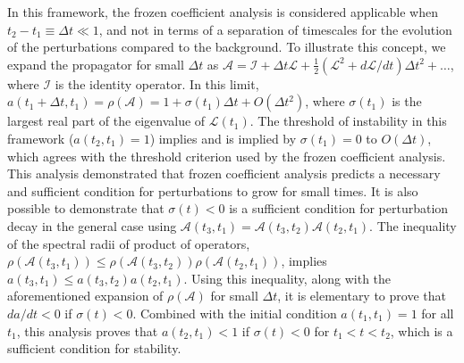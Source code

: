 \documentclass[letterpaper,10pt,prl,twocolumn,aps,reprint,superscriptaddress]{revtex4-1}
\newcommand{\cL}{\boldsymbol{\mathcal{L}}}
\newcommand{\cA}{\boldsymbol{\mathcal{A}}}
\newcommand{\cI}{\boldsymbol{\mathcal{I}}}
\begin{document}
In this framework, the frozen coefficient analysis is considered applicable when $t_2 - t_1 \equiv \Delta t \ll 1$, and not in terms of a separation of timescales for the evolution of the perturbations compared to the background.
To illustrate this concept, we expand the propagator for small $\Delta t$ as $\cA = \cI + \Delta t \cL + \frac{1}{2} \left(\cL^2 + d\cL/dt \right) \Delta t^2 + \dots$, where $\cI$ is the identity operator. 
In this limit, $a(t_1 + \Delta t, t_1) = \rho(\cA) = 1 + \sigma(t_1) \Delta t + O(\Delta t^2)$, where $\sigma(t_1)$ is the largest real part of the eigenvalue of $\cL(t_1)$.
The threshold of instability in this framework ($a(t_2,t_1) = 1$) implies and is implied by $\sigma(t_1) = 0$ to $O(\Delta t)$, which agrees with the threshold criterion used by the frozen coefficient analysis.
This analysis demonstrated that frozen coefficient analysis predicts a necessary and sufficient condition for perturbations to grow for small times. It is also possible to demonstrate that $\sigma(t) < 0$ is a sufficient condition for perturbation decay in the general case using $\cA(t_3,t_1) = \cA (t_3, t_2) \cA(t_2, t_1)$. The inequality of the spectral radii of product of operators, $\rho(\cA(t_3,t_1)) \le \rho(\cA(t_3,t_2)) \rho(\cA(t_2,t_1))$, implies $a(t_3, t_1) \le a(t_3, t_2) a(t_2, t_1)$. Using this inequality, along with the aforementioned expansion of $\rho(\cA)$ for small $\Delta t$, it is elementary to prove that $da/dt < 0$ if $\sigma(t)<0$. Combined with the initial condition $a(t_1, t_1) = 1$ for all $t_1$, this analysis proves that $a(t_2, t_1)<1$ if $\sigma(t)<0$ for $t_1<t<t_2$, which is a sufficient condition for stability.
\end{document}
